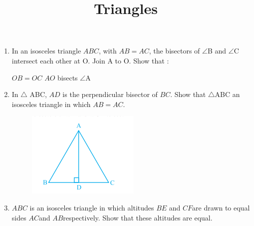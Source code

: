 \documentclass[12pt]{article}
\begin{document}
\title{\textbf{Triangles}}
\maketitle
\begin{center}
\end{center}

\begin{enumerate}
\section*{9$^{th}$ Maths - Chapter 7}

\item In an isosceles triangle $ABC$, with $AB = AC$, the bisectors of $\angle$B and $\angle$C intersect each other at O. Join A to O. Show that :
\begin{enumerate}
$OB = OC$  $AO$ bisects $\angle$A
\end{enumerate}
\item In $\triangle$ ABC, $AD$ is the perpendicular bisector of $BC$. Show that $\triangle$ABC an isosceles triangle in which $AB = AC$.
\begin{figure}[!h]
\begin{center}
\includegraphics[width=\columnwidth]{./figs/triangle2.png}
\end{center}                                      \caption{}                                        \label{fig:Fig1}                                  \end{figure}
\item $ABC$ is an isosceles triangle in which altitudes $BE$ and $CF $are drawn to equal sides $AC $and $AB$respectively. Show that these altitudes are equal.

\end{enumerate}
\end{document}
